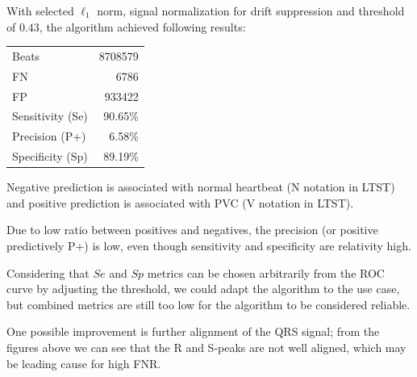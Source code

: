 \documentclass[fleqn,moreauthors,10pt]{ds_report}
\begin{document}
With selected $\ell_1$ norm, signal normalization for drift suppression and threshold of $0.43$, the algorithm achieved following results:
\begin{table}[hbt]
	\centering
	\begin{tabular}{l | r}
		\toprule
		Beats             & 8708579  \\
		FN                & 6786     \\
		FP                & 933422   \\
		Sensitivity (Se)  & 90.65\%  \\
		Precision (P+) 	  & 6.58\%   \\
		Specificity (Sp)  & 89.19\%  \\
		\bottomrule
	\end{tabular}
	\label{tab:label}
\end{table}
Negative prediction is associated with normal heartbeat (N notation in LTST) and positive prediction is associated with PVC (V notation in LTST).

Due to low ratio between positives and negatives, the precision (or positive predictively P+) is low, even though sensitivity and specificity are relativity high.

Considering that $Se$ and $Sp$ metrics can be chosen arbitrarily from the ROC curve by adjusting the threshold, we could adapt the algorithm to the use case, but combined metrics are still too low for the algorithm to be considered reliable.

One possible improvement is further alignment of the QRS signal; from the figures above we can see that the R and S-peaks are not well aligned, which may be leading cause for high FNR.



\end{document}
